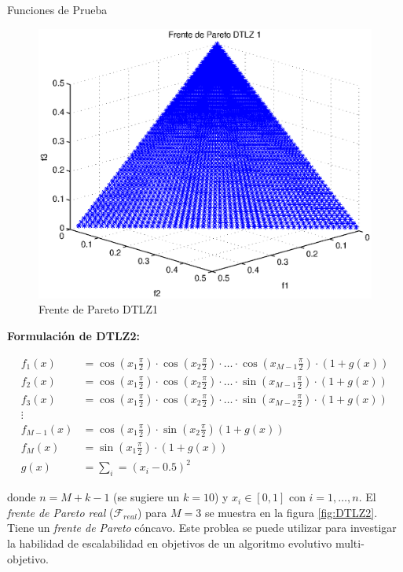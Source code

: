 \begin{chapter}{Funciones de Prueba}
\begin{figure}[h!]
 \centering
\includegraphics[scale=0.4]{ApendiceA/paretoDTLZ1.eps}
\caption{Frente de Pareto DTLZ1}
\label{fig:DTLZ1}
\end{figure}

\textbf{Formulaci\'on de DTLZ2:}

\begin{align*}
f_1(x)&=\cos(x_1\frac{\pi}{2})\cdot\cos(x_2\frac{\pi}{2})\cdot\ldots\cdot\cos(x_{M-1}\frac{\pi}{2})\cdot(1+g(x))\\
f_2(x)&=\cos(x_1\frac{\pi}{2})\cdot\cos(x_2\frac{\pi}{2})\cdot\ldots\cdot\sin(x_{M-1}\frac{\pi}{2})\cdot(1+g(x))\\
f_3(x)&=\cos(x_1\frac{\pi}{2})\cdot\cos(x_2\frac{\pi}{2})\cdot\ldots\cdot\sin(x_{M-2}\frac{\pi}{2})\cdot(1+g(x))\\
\vdots&\\
f_{M-1}(x)&=\cos(x_1\frac{\pi}{2})\cdot\sin(x_2\frac{\pi}{2})(1+g(x))\\
f_{M}(x)&=\sin(x_1\frac{\pi}{2})\cdot(1+g(x))\\
g(x)&=\sum_i=(x_i-0.5)^2
\end{align*}

donde $n=M+k-1$ (se sugiere un $k=10$) y $x_i\in[0,1]$ con $i= 1, \ldots, n$. El \textit{frente de Pareto real} ($\mathcal{F}_{real}$)
para $M=3$ se muestra en la figura \ref{fig:DTLZ2}. Tiene un {\it frente de Pareto}  c\'oncavo. Este problea se puede utilizar para 
investigar la habilidad de escalabilidad en objetivos de un algoritmo evolutivo multi-objetivo.


\end{chapter}
